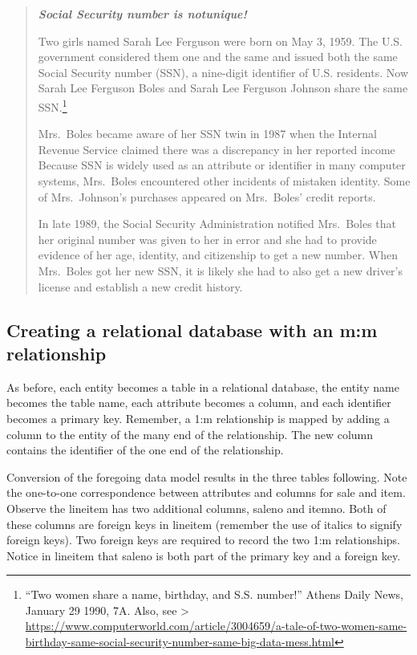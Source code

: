\documentclass[
]{article}
\begin{document}
\begin{quote}
\textbf{\emph{Social Security number is notunique!}}

Two girls named Sarah Lee Ferguson were born on May 3, 1959. The U.S. government considered them one and the same and issued both the same Social Security number (SSN), a nine-digit identifier of U.S. residents. Now Sarah Lee Ferguson Boles and Sarah Lee Ferguson Johnson share the same SSN.\footnote{``Two women share a name, birthday, and S.S. number!'' Athens Daily News, January 29 1990, 7A. Also, see \textgreater{} \url{https://www.computerworld.com/article/3004659/a-tale-of-two-women-same-birthday-same-social-security-number-same-big-data-mess.html}}

Mrs.~Boles became aware of her SSN twin in 1987 when the Internal Revenue Service claimed there was a discrepancy in her reported income Because SSN is widely used as an attribute or identifier in many computer systems, Mrs.~Boles encountered other incidents of mistaken identity. Some of Mrs.~Johnson's purchases appeared on Mrs.~Boles' credit reports.

In late 1989, the Social Security Administration notified Mrs.~Boles that her original number was given to her in error and she had to provide evidence of her age, identity, and citizenship to get a new number. When Mrs.~Boles got her new SSN, it is likely she had to also get a new driver's license and establish a new credit history.
\end{quote}

\hypertarget{creating-a-relational-database-with-an-mm-relationship}{%
\subsection*{Creating a relational database with an m:m relationship}\label{creating-a-relational-database-with-an-mm-relationship}}

As before, each entity becomes a table in a relational database, the entity name becomes the table name, each attribute becomes a column, and each identifier becomes a primary key. Remember, a 1:m relationship is mapped by adding a column to the entity of the many end of the relationship. The new column contains the identifier of the one end of the relationship.

Conversion of the foregoing data model results in the three tables following. Note the one-to-one correspondence between attributes and columns for sale and item. Observe the lineitem has two additional columns, saleno and itemno. Both of these columns are foreign keys in lineitem (remember the use of italics to signify foreign keys). Two foreign keys are required to record the two 1:m relationships. Notice in lineitem that saleno is both part of the primary key and a foreign key.
\end{document}
